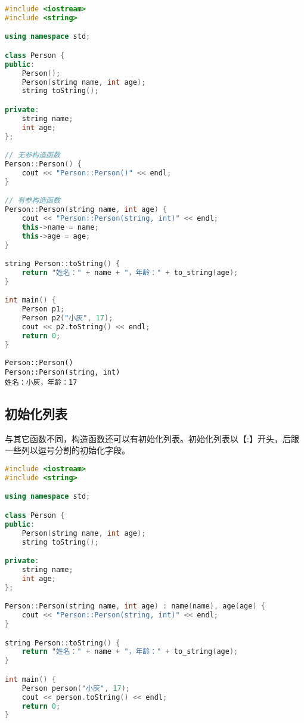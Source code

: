
\begin{lstlisting}[language=C++]
#include <iostream>
#include <string>

using namespace std;

class Person {
public:
    Person();
    Person(string name, int age);
    string toString();

private:
    string name;
    int age;
};

// 无参构造函数
Person::Person() {
    cout << "Person::Person()" << endl;
}

// 有参构造函数
Person::Person(string name, int age) {
    cout << "Person::Person(string, int)" << endl;
    this->name = name;
    this->age = age;
}

string Person::toString() {
    return "姓名：" + name + "，年龄：" + to_string(age);
}

int main() {
    Person p1;
    Person p2("小灰", 17);
    cout << p2.toString() << endl;
    return 0;
}
\end{lstlisting}

\begin{tcolorbox}
	\begin{verbatim}
Person::Person()
Person::Person(string, int)
姓名：小灰，年龄：17
	\end{verbatim}
\end{tcolorbox}

\subsection{初始化列表}

与其它函数不同，构造函数还可以有初始化列表。初始化列表以【:】开头，后跟一些列以逗号分割的初始化字段。 \\


\begin{lstlisting}[language=C++]
#include <iostream>
#include <string>

using namespace std;

class Person {
public:
    Person(string name, int age);
    string toString();

private:
    string name;
    int age;
};

Person::Person(string name, int age) : name(name), age(age) {
    cout << "Person::Person(string, int)" << endl;
}

string Person::toString() {
    return "姓名：" + name + "，年龄：" + to_string(age);
}

int main() {
    Person person("小灰", 17);
    cout << person.toString() << endl;    
    return 0;
}
\end{lstlisting}

